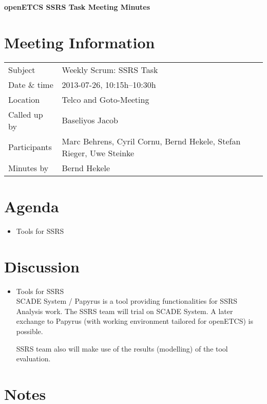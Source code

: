 \documentclass[a4paper, 11pt]{article}
\begin{document}
{\begin{center}\huge\bf openETCS SSRS Task Meeting Minutes\end{center}}
\section{Meeting Information}

\renewcommand{\arraystretch}{1.5}
\begin{supertabular}{m{.2\textwidth}m{.8\textwidth}}
Subject &  Weekly Scrum: SSRS Task\\
Date \& time & 2013-07-26, 10:15h--10:30h\\
Location & Telco and Goto-Meeting\\
Called up by & Baseliyos Jacob\\
Participants &
Marc Behrens,
Cyril Cornu,
Bernd Hekele,
Stefan Rieger,
Uwe Steinke
\\

Minutes by & Bernd Hekele\\

\end{supertabular}
\renewcommand{\arraystretch}{1.0}


\section{{Agenda}}
\begin{itemize}
\item Tools for SSRS\\
\end{itemize}

\section{Discussion}
\begin{itemize}
\item Tools for SSRS\\
SCADE System / Papyrus is a tool providing functionalities for SSRS Analysis work. The SSRS team will trial on SCADE System. A later exchange to Papyrus (with working environment tailored for openETCS) is possible.

SSRS team also will make use of the results (modelling) of the tool evaluation.

\end{itemize}


\section{Notes}
\end{document}
